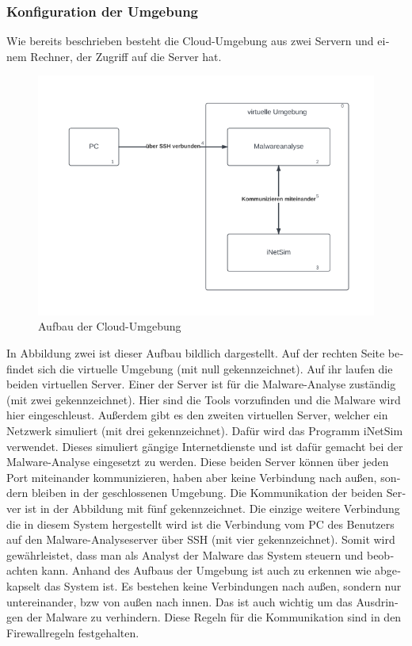 \begin{otherlanguage}{ngerman}
\subsubsection{Konfiguration der Umgebung}
Wie bereits beschrieben besteht die Cloud-Umgebung aus zwei Servern und einem Rechner, der Zugriff auf die Server hat.
\begin{figure}[h!]
    \centering
    \includegraphics[scale=0.7]{LaTeX/graphic/virtuelleUmgebung.png}
    \caption{Aufbau der Cloud-Umgebung}
\end{figure}
\newline
In Abbildung zwei ist dieser Aufbau bildlich dargestellt. Auf der rechten Seite befindet sich die virtuelle Umgebung (mit null gekennzeichnet). Auf ihr laufen die beiden virtuellen Server. Einer der Server ist für die Malware-Analyse zuständig (mit zwei gekennzeichnet). Hier sind die Tools vorzufinden und die Malware wird hier eingeschleust. Außerdem gibt es den zweiten virtuellen Server, welcher ein Netzwerk simuliert (mit drei gekennzeichnet). Dafür wird das Programm \dq iNetSim \dq{} verwendet. Dieses simuliert gängige Internetdienste und ist dafür gemacht bei der Malware-Analyse eingesetzt zu werden.
\newline
Diese beiden Server können über jeden Port miteinander kommunizieren, haben aber keine Verbindung nach außen, sondern bleiben in der geschlossenen Umgebung. Die Kommunikation der beiden Server ist in der Abbildung mit fünf gekennzeichnet. Die einzige weitere Verbindung die in diesem System hergestellt wird ist die Verbindung vom PC des Benutzers auf den Malware-Analyseserver über SSH (mit vier gekennzeichnet). Somit wird gewährleistet, dass man als Analyst der Malware das System steuern und beobachten kann. 
\newline
Anhand des Aufbaus der Umgebung ist auch zu erkennen wie abgekapselt das System ist. Es bestehen keine Verbindungen nach außen, sondern nur untereinander, bzw von außen nach innen. Das ist auch wichtig um das Ausdringen der Malware zu verhindern. Diese Regeln für die Kommunikation sind in den Firewallregeln festgehalten. 

\end{otherlanguage}
